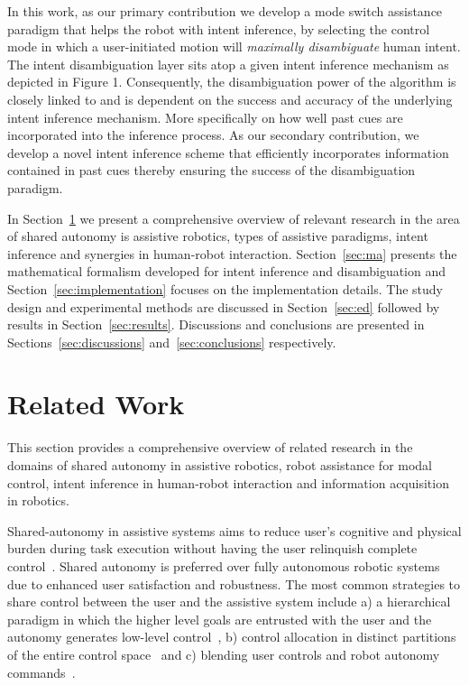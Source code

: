 In this work, as our primary contribution we develop a mode switch assistance paradigm that helps the robot with intent inference, by selecting the control mode in which a user-initiated motion will \textit{maximally disambiguate} human intent. The intent disambiguation layer sits atop a given intent inference mechanism as depicted in Figure 1. Consequently, the disambiguation power of the algorithm is closely linked to and is dependent on the success and accuracy of the underlying intent inference mechanism. More specifically on how well past cues are incorporated into the inference process. As our secondary contribution, we develop a novel intent inference scheme that efficiently incorporates information contained in past cues thereby ensuring the success of the disambiguation paradigm. 

In Section~\ref{sec:related-work} we present a comprehensive overview of relevant research in the area of shared autonomy is assistive robotics, types of assistive paradigms, intent inference and synergies in human-robot interaction. Section~\ref{sec:ma} presents the mathematical formalism developed for intent inference and disambiguation and Section~\ref{sec:implementation} focuses on the implementation details. The study design and experimental methods are discussed in Section~\ref{sec:ed} followed by results in Section~\ref{sec:results}. Discussions and conclusions are presented in Sections~\ref{sec:discussions} and~\ref{sec:conclusions} respectively. 


%


\section{Related Work}\label{sec:related-work}
This section provides a comprehensive overview of related research in the domains of shared autonomy in assistive robotics, robot assistance for modal control, intent inference in human-robot interaction and information acquisition in robotics. 

Shared-autonomy in assistive systems aims to reduce user's cognitive and physical burden during task execution without having the user relinquish complete control~\cite{philips2007adaptive,demeester2008user, gopinath2017human, muelling2017autonomy}. Shared autonomy is preferred over fully autonomous robotic systems due to enhanced user satisfaction and robustness. The most common strategies to share control between the user and the assistive system include a) a hierarchical paradigm in which the higher level goals are entrusted with the user and the autonomy generates low-level control~\cite{tsui2011want, kim2010relationship, kim2012autonomy}, b) control allocation in distinct partitions of the entire control space~\cite{driessen2005collaborative} and c) blending user controls and robot autonomy commands~\cite{downey2016blending, storms2014blending, muelling2017autonomy}. 

